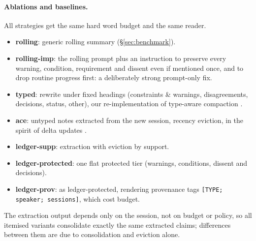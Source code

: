 \paragraph{Ablations and baselines.}
All strategies get the same hard word budget and the same reader.
\begin{itemize}
\item \textbf{rolling}: generic rolling summary (\S\ref{sec:benchmark}).
\item \textbf{rolling-imp}: the rolling prompt plus an instruction to preserve every warning, condition, requirement and dissent even if mentioned once, and to drop routine progress first: a deliberately strong prompt-only fix.
\item \textbf{typed}: rewrite under fixed headings (constraints \& warnings, disagreements, decisions, status, other), our re-implementation of type-aware compaction \citep{zerhoudi2026compaction}.
\item \textbf{ace}: untyped notes extracted from the new session, recency eviction, in the spirit of delta updates \citep{zhang2026ace}.
\item \textbf{ledger-supp}: \ledger{} extraction with eviction by support.
\item \textbf{ledger-protected}: one flat protected tier (warnings, conditions, dissent and decisions).
\item \textbf{ledger-prov}: as ledger-protected, rendering provenance tags \texttt{[TYPE; speaker; sessions]}, which cost budget.
\end{itemize}
The extraction output depends only on the session, not on budget or policy, so all itemised variants consolidate exactly the same extracted claims; differences between them are due to consolidation and eviction alone.

